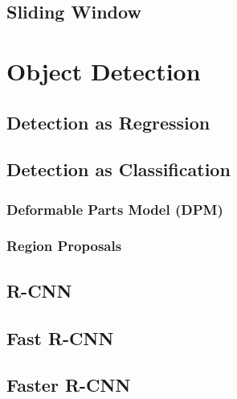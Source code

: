 		\subsection{Sliding Window} %

	\section{Object Detection} %

		\subsection{Detection as Regression} %

		\subsection{Detection as Classification} %

			\subsubsection{Deformable Parts Model (DPM)} %

			\subsubsection{Region Proposals} %

		\subsection{R-CNN} %

		\subsection{Fast R-CNN} %

		\subsection{Faster R-CNN} %

